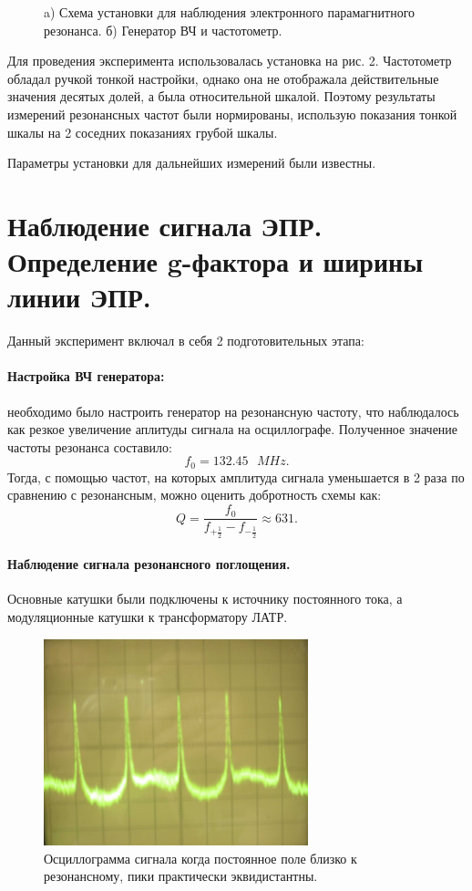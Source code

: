 \documentclass[a4paper, 14pt]{extarticle}%
\newcommand\ECaption[1]{%
     \captionsetup{font=footnotesize}%
     \caption{#1}}
\begin{document}
\begin{figure}[h!]
\begin{minipage}[h]{0.5\linewidth}
\end{minipage}
\ECaption{a) Схема установки для наблюдения электронного парамагнитного резонанса. б) Генератор ВЧ и частотометр.}
\end{figure}

Для проведения эксперимента использовалась установка на рис. 2.
Частотометр обладал ручкой тонкой настройки, однако она не отображала действительные значения десятых долей, а была относительной шкалой. Поэтому результаты измерений резонансных частот были нормированы, использую показания тонкой шкалы на 2 соседних показаниях грубой шкалы.

Параметры установки для дальнейших измерений были известны.


\section*{Наблюдение сигнала ЭПР. Определение g-фактора и ширины линии ЭПР.}

Данный эксперимент включал в себя 2 подготовительных этапа:
\paragraph*{Настройка ВЧ генератора:} необходимо было настроить генератор на резонансную частоту, что наблюдалось как резкое увеличение аплитуды сигнала на осциллографе. Полученное значение частоты резонанса составило:
\[f_0 = 132.45 \text{ }MHz.\]
Тогда, с помощью частот, на которых амплитуда сигнала уменьшается в 2 раза по сравнению с резонансным, можно оценить добротность схемы как:
\[Q = \frac{f_0}{f_{+\frac{1}{2}}-f_{-\frac{1}{2}}} \approx 631.\]

\paragraph*{Наблюдение сигнала резонансного поглощения.}
Основные катушки были подключены  к источнику постоянного тока, а модуляционные катушки к
трансформатору ЛАТР.
\begin{figure}
\begin{center}
\includegraphics[height=6cm]{ust3}
\end{center}
\ECaption{Осциллограмма сигнала когда постоянное поле
близко к резонансному, пики практически эквидистантны.}
\end{figure}
\end{document}
